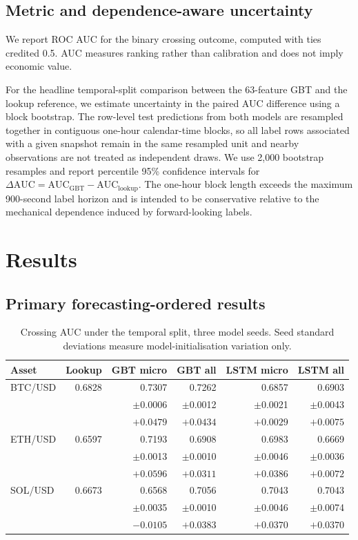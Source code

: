 \documentclass[11pt]{article}
\begin{document}
\subsection{Metric and dependence-aware uncertainty}
We report ROC AUC for the binary crossing outcome, computed with ties credited 0.5. AUC measures ranking rather than calibration and does not imply economic value.

For the headline temporal-split comparison between the 63-feature GBT and the lookup reference, we estimate uncertainty in the paired AUC difference using a block bootstrap. The row-level test predictions from both models are resampled together in contiguous one-hour calendar-time blocks, so all label rows associated with a given snapshot remain in the same resampled unit and nearby observations are not treated as independent draws. We use 2,000 bootstrap resamples and report percentile 95\% confidence intervals for $\Delta\mathrm{AUC}=\mathrm{AUC}_{\mathrm{GBT}}-\mathrm{AUC}_{\mathrm{lookup}}$. The one-hour block length exceeds the maximum 900-second label horizon and is intended to be conservative relative to the mechanical dependence induced by forward-looking labels.

\section{Results}
\subsection{Primary forecasting-ordered results}
\begin{table}[ht]
\centering
\caption{Crossing AUC under the temporal split, three model seeds. Seed standard deviations measure model-initialisation variation only.}
\small
\begin{tabular}{lrrrrr}
\toprule
Asset & Lookup & GBT micro & GBT all & LSTM micro & LSTM all \\
\midrule
BTC/USD & 0.6828 & 0.7307 & 0.7262 & 0.6857 & 0.6903 \\
& & \tiny$\pm$0.0006 & \tiny$\pm$0.0012 & \tiny$\pm$0.0021 & \tiny$\pm$0.0043 \\
& & $+0.0479$ & $+0.0434$ & $+0.0029$ & $+0.0075$ \\
\addlinespace
ETH/USD & 0.6597 & 0.7193 & 0.6908 & 0.6983 & 0.6669 \\
& & \tiny$\pm$0.0013 & \tiny$\pm$0.0010 & \tiny$\pm$0.0046 & \tiny$\pm$0.0036 \\
& & $+0.0596$ & $+0.0311$ & $+0.0386$ & $+0.0072$ \\
\addlinespace
SOL/USD & 0.6673 & 0.6568 & 0.7056 & 0.7043 & 0.7043 \\
& & \tiny$\pm$0.0035 & \tiny$\pm$0.0010 & \tiny$\pm$0.0046 & \tiny$\pm$0.0074 \\
& & $-0.0105$ & $+0.0383$ & $+0.0370$ & $+0.0370$ \\
\bottomrule
\end{tabular}
\end{table}
\end{document}
